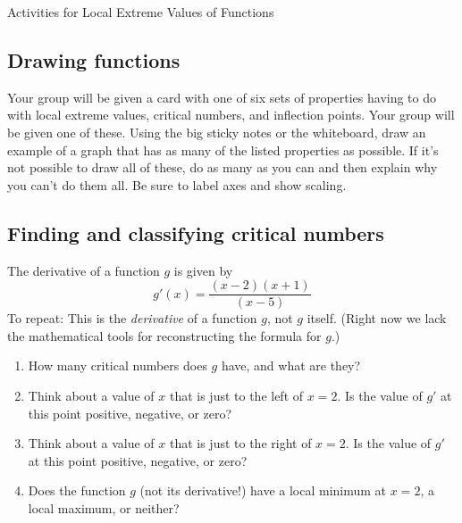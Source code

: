 \documentclass[11pt]{article}
\begin{document}
\begin{center}
    \Large{Activities for Local Extreme Values of Functions}
\end{center}


\subsection*{Drawing functions}

Your group will be given a card with one of six sets of properties having to do with local extreme values, critical numbers, and inflection points. Your group will be given one of these. Using the big sticky notes or the whiteboard, draw an example of a graph that has as many of the listed properties as possible. If it's not possible to draw all of these, do as many as you can and then explain why you can't do them all. Be sure to label axes and show scaling. 


\subsection*{Finding and classifying critical numbers}

The derivative of a function $g$ is given by 
$$g'(x) = \dfrac{(x-2)(x+1)}{(x-5)}$$
To repeat: This is the \emph{derivative} of a function $g$, not $g$ itself. (Right now we lack the mathematical tools for reconstructing the formula for $g$.) 

\begin{enumerate}
    \item How many critical numbers does $g$ have, and what are they? 
    \item Think about a value of $x$ that is just to the left of $x = 2$. Is the value of $g'$ at this point positive, negative, or zero?
    \item Think about a value of $x$ that is just to the right of $x = 2$. Is the value of $g'$ at this point positive, negative, or zero?
    \item Does the function $g$ (not its derivative!) have a local minimum at $x=2$, a local maximum, or neither? 
\end{enumerate}
\end{document}
